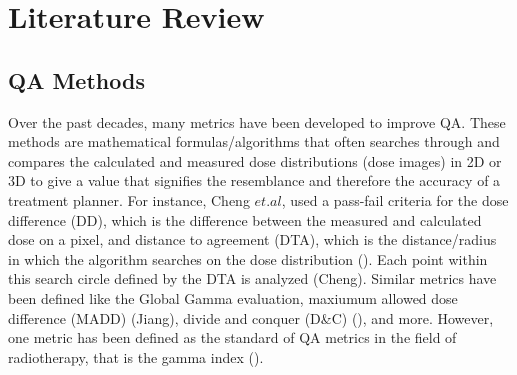 \documentclass[12pt]{article}
\begin{document}
\section{Literature Review}
\subsection{QA Methods}
Over the past decades, many metrics have been developed to improve QA. These methods are mathematical formulas/algorithms that often searches through and compares the calculated and measured dose distributions (dose images) in 2D or 3D to give a value that signifies the resemblance and therefore the accuracy of a treatment planner. For instance, Cheng $et. al$, used a pass-fail criteria for the dose difference (DD), which is the difference between the measured and calculated dose on a pixel, and distance to agreement (DTA), which is the distance/radius in which the algorithm searches on the dose distribution (\textcite{Cheng}). Each point within this search circle defined by the DTA is analyzed (Cheng). Similar metrics have been defined like the Global Gamma evaluation, maxiumum allowed dose difference (MADD) (Jiang), divide and conquer (D\&C) (\textcite{Stojadinovic}), and more. However, one metric has been defined as the standard of QA metrics in the field of radiotherapy, that is the gamma index (\textcite{Low}).
\end{document}
